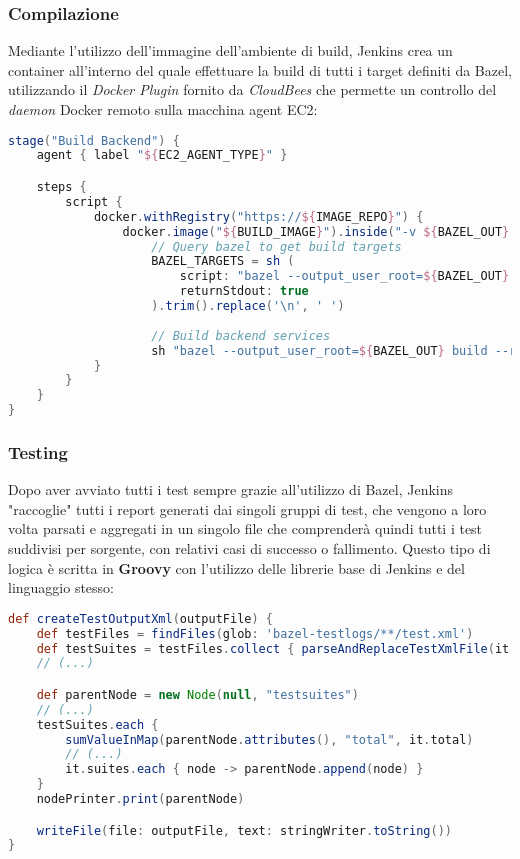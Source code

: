 \documentclass[../main.tex]{subfiles}
\begin{document}
        	    \subsubsection{Compilazione}
        	    
            	    Mediante l'utilizzo dell'immagine dell'ambiente di build, Jenkins crea un container all'interno del quale effettuare la build di tutti i target definiti da Bazel, utilizzando il \emph{Docker Plugin} fornito da \emph{CloudBees} che permette un controllo del \emph{daemon} Docker remoto sulla macchina agent EC2:
            	    \begin{lstlisting}[language=Groovy]
stage("Build Backend") {
    agent { label "${EC2_AGENT_TYPE}" }

    steps {
        script {
            docker.withRegistry("https://${IMAGE_REPO}") {
                docker.image("${BUILD_IMAGE}").inside("-v ${BAZEL_OUT}:${BAZEL_OUT}") {
                    // Query bazel to get build targets
                    BAZEL_TARGETS = sh (
                        script: "bazel --output_user_root=${BAZEL_OUT} query //...",
                        returnStdout: true
                    ).trim().replace('\n', ' ')
    
                    // Build backend services
                    sh "bazel --output_user_root=${BAZEL_OUT} build --remote_cache=${BAZEL_CACHE_URL} ${BAZEL_TARGETS}"
            }
        }
    }
}
        	        \end{lstlisting}
        	    
        	    \subsubsection{Testing}
        	    
        	        Dopo aver avviato tutti i test sempre grazie all'utilizzo di Bazel, Jenkins "raccoglie" tutti i report generati dai singoli gruppi di test, che vengono a loro volta parsati e aggregati in un singolo file che comprenderà quindi tutti i test suddivisi per sorgente, con relativi casi di successo o fallimento. Questo tipo di logica è scritta in \textbf{Groovy} con l'utilizzo delle librerie base di Jenkins e del linguaggio stesso:
        	        \begin{lstlisting}[language=Groovy]
def createTestOutputXml(outputFile) {
    def testFiles = findFiles(glob: 'bazel-testlogs/**/test.xml')
    def testSuites = testFiles.collect { parseAndReplaceTestXmlFile(it.path) }
    // (...)

    def parentNode = new Node(null, "testsuites")
    // (...)
    testSuites.each {
        sumValueInMap(parentNode.attributes(), "total", it.total)
        // (...)
        it.suites.each { node -> parentNode.append(node) }
    }
    nodePrinter.print(parentNode)

    writeFile(file: outputFile, text: stringWriter.toString())
}
        	        \end{lstlisting}
        	
\end{document}
